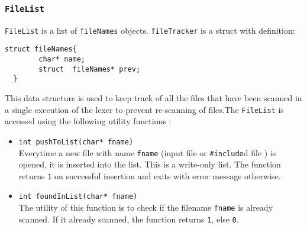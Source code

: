 \documentclass[12pt]{article}
\begin{document}
\subsubsection{\texttt{FileList}}
\label{FL}

\texttt{FileList} is a list of \texttt{fileNames} objects. \texttt{fileTracker} is a struct with definition:
\begin{verbatim}
struct fileNames{
        char* name;
        struct  fileNames* prev;
  }
\end{verbatim}
This data structure is used to keep track of all the files that have been scanned in a single execution of the lexer to prevent re-scanning of files.The \texttt{FileList} is accessed using the following utility functions :

\begin{itemize}
\item \texttt{int pushToList(char* fname)}
\\Everytime a new file with name \texttt{fname} (input file or \texttt{\#include}d file ) is opened, it is inserted into the list. This is a write-only list. The function returns \texttt{1} on successful insertion and exits with error message otherwise. 

\item \texttt{int foundInList(char* fname)}
\\ The utility of this function is to check if the filename \texttt{fname} is already scanned. If it already scanned, the function returns \texttt{1}, else \texttt{0}.

\end{itemize}
\end{document}

